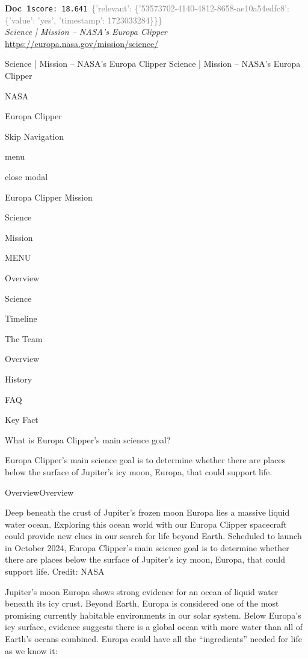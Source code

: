 \documentclass[a4paper,11pt]{article}
\begin{document}
\begin{docenv}
{\footnotesize\textcolor{doccolor}{\textbf{Doc~1}}}\hfill{\tiny\texttt{score:~18.641}}\ {\tiny\textcolor{gray}{\{'relevant': \{'53573702-4140-4812-8658-ae10a54edfc8': \{'value': 'yes', 'timestamp': 1723033284\}\}\}}}\\[3pt]
{\small\textit{Science | Mission – NASA's Europa Clipper}}\\[2pt]
{\tiny\url{https://europa.nasa.gov/mission/science/}}\\[4pt]
{\footnotesize Science | Mission – NASA's Europa Clipper
Science | Mission – NASA's Europa Clipper

NASA

Europa Clipper

Skip Navigation

menu

close modal

Europa Clipper Mission

Science

Mission

MENU

Overview

Science

Timeline

The Team

Overview

History

FAQ

Key Fact

What is Europa Clipper's main science goal? 

Europa Clipper’s main science goal is to determine whether there are places below the surface of Jupiter’s icy moon, Europa, that could support life.

OverviewOverview

Deep beneath the crust of Jupiter’s frozen moon Europa lies a massive liquid water ocean. Exploring this ocean world with our Europa Clipper spacecraft could provide new clues in our search for life beyond Earth. Scheduled to launch in October 2024, Europa Clipper’s main science goal is to determine whether there are places below the surface of Jupiter’s icy moon, Europa, that could support life. Credit: NASA

Jupiter’s moon Europa shows strong evidence for an ocean of liquid water beneath its icy crust. Beyond Earth, Europa is considered one of the most promising currently habitable environments in our solar system. 
Below Europa’s icy surface, evidence suggests there is a global ocean with more water than all of Earth’s oceans combined. Europa could have all the “ingredients” needed for life as we know it: 

}
\end{docenv}
\end{document}

